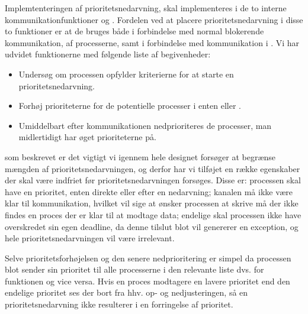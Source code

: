 Implemtenteringen af prioritetsnedarvning, skal implementeres i de to interne kommunikationfunktioner   og . Fordelen ved at placere prioritetsnedarvning i disse to funktioner er at de bruges både i forbindelse med normal blokerende kommunikation, af processerne, samt i forbindelse med kommunikation i . Vi har udvidet funktionerne med følgende liste af begivenheder:
\begin{itemize}
\tightlist
	\item Undersøg om processen opfylder kriterierne for at starte en prioritetsnedarvning.
	\item Forhøj prioriteterne for de potentielle processer i enten  eller .
	\item Umiddelbart efter kommunikationen nedprioriteres de processer, man midlertidigt har øget prioriteterne på.
\end{itemize}

som beskrevet er det vigtigt vi igennem hele designet forsøger at begrænse mængden af prioritetsnedarvningen, og derfor har vi tilføjet en række egenskaber  der skal være indfriet før prioritetsnedarvningen forsøges. Disse er: processen skal have en prioritet, enten direkte eller efter en nedarvning; kanalen må ikke være klar til kommunikation, hvilket vil sige at ønsker processen at skrive må der ikke findes en proces der er klar til at modtage data; endelige skal processen ikke have overskredet sin egen deadline, da denne tilslut blot vil genererer en exception, og hele prioritetsnedarvningen vil være irrelevant.

Selve prioritetsforhøjelsen og den senere nedprioritering er simpel da processen blot sender sin prioritet til alle processerne i den relevante liste dvs.  for   funktionen og vice versa. Hvis en proces modtagere en lavere prioritet end den endelige prioritet ses der bort fra hhv. op- og nedjusteringen, så en prioritetsnedarvning ikke resulterer i en forringelse af prioritet. 

